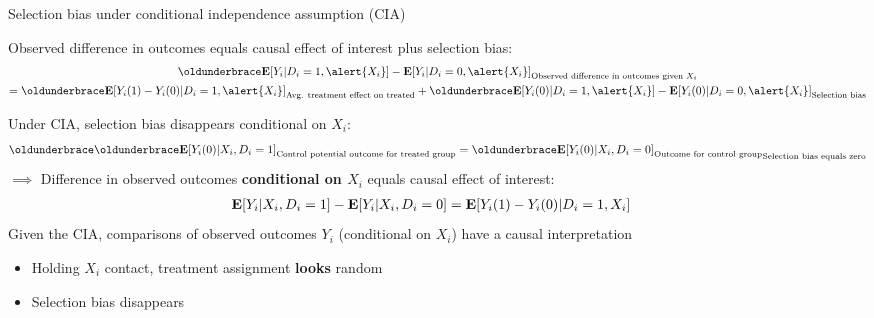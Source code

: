 \begin{frame}{Selection bias under conditional independence assumption (CIA)}

Observed difference in outcomes equals causal effect of interest plus selection bias:
\begin{multline*}
\underbrace{\EE [Y_i \vert D_i = 1, \alert{X_i}] - \EE [Y_i \vert D_i = 0,  \alert{X_i}]}_{\text{Observed difference in outcomes given $X_i$}} \\
= \underbrace{\EE [Y_i (1) - Y_i (0) \vert D_i = 1, \alert{X_i}]}_{\text{Avg.  treatment effect on treated}} 
+ \underbrace{\EE [Y_i (0) \vert D_i = 1, \alert{X_i}] - \EE [Y_i (0) \vert D_i=0, \alert{X_i}]}_{\text{Selection bias}}
\end{multline*}

Under CIA, selection bias disappears conditional on $X_i$:
\begin{align*}
    \underbrace{\underbrace{\EE [Y_{i} (0) \vert X_i, D_i = 1]}_{\text{Control potential outcome for treated group}} =\underbrace{ \EE [Y_{i} (0) \vert X_i, D_i = 0]}_{\text{Outcome for control group}}}_{\text{Selection bias equals zero}}
\end{align*}
$\implies$ Difference in observed outcomes \textbf{conditional on $X_i$} equals causal effect of interest:
\begin{align*}
    \mathbf{E} [Y_i \vert X_i, D_i = 1] - \mathbf{E} [Y_i \vert X_i, D_i = 0] 
    &= \mathbf{E} [Y_{i} (1) - Y_{i} (0) \vert D_i = 1, X_i]
\end{align*}
Given the CIA, comparisons of observed outcomes $Y_i$ (conditional on $X_i$) have a causal interpretation
\begin{itemize}
    \item Holding $X_i$ contact, treatment assignment \textbf{looks} random
    \item Selection bias disappears
\end{itemize}

\end{frame}

